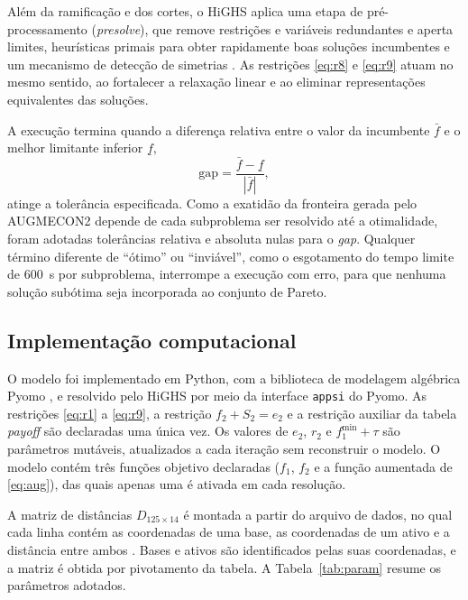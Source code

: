 \documentclass[conference]{IEEEtran}
\begin{document}
Além da ramificação e dos cortes, o HiGHS aplica uma etapa de pré-processamento (\textit{presolve}), que remove restrições e variáveis redundantes e aperta limites, heurísticas primais para obter rapidamente boas soluções incumbentes e um mecanismo de detecção de simetrias \cite{highs}. As restrições \eqref{eq:r8} e \eqref{eq:r9} atuam no mesmo sentido, ao fortalecer a relaxação linear e ao eliminar representações equivalentes das soluções.

A execução termina quando a diferença relativa entre o valor da incumbente $\bar f$ e o melhor limitante inferior $\underline f$,
\begin{equation}
\text{gap} = \frac{\bar f - \underline f}{|\bar f|},
\end{equation}
atinge a tolerância especificada. Como a exatidão da fronteira gerada pelo AUGMECON2 depende de cada subproblema ser resolvido até a otimalidade, foram adotadas tolerâncias relativa e absoluta nulas para o \textit{gap}. Qualquer término diferente de ``ótimo'' ou ``inviável'', como o esgotamento do tempo limite de 600~s por subproblema, interrompe a execução com erro, para que nenhuma solução subótima seja incorporada ao conjunto de Pareto.

\subsection{Implementação computacional}

O modelo foi implementado em Python, com a biblioteca de modelagem algébrica Pyomo \cite{bynum2021}, e resolvido pelo HiGHS \cite{highs} por meio da interface \texttt{appsi} do Pyomo. As restrições \eqref{eq:r1} a \eqref{eq:r9}, a restrição $f_2 + S_2 = e_2$ e a restrição auxiliar da tabela \textit{payoff} são declaradas uma única vez. Os valores de $e_2$, $r_2$ e $f_1^{\min} + \tau$ são parâmetros mutáveis, atualizados a cada iteração sem reconstruir o modelo. O modelo contém três funções objetivo declaradas ($f_1$, $f_2$ e a função aumentada de \eqref{eq:aug}), das quais apenas uma é ativada em cada resolução.

A matriz de distâncias $D_{125\times14}$ é montada a partir do arquivo de dados, no qual cada linha contém as coordenadas de uma base, as coordenadas de um ativo e a distância entre ambos \cite{batista_tc}. Bases e ativos são identificados pelas suas coordenadas, e a matriz é obtida por pivotamento da tabela. A Tabela~\ref{tab:param} resume os parâmetros adotados.
\end{document}
